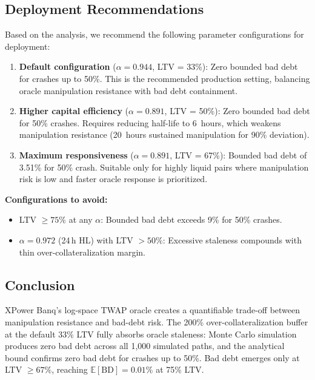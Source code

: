 \documentclass[10pt,a4paper,twocolumn]{article}
\theoremstyle{definition}
\theoremstyle{plain}
\theoremstyle{remark}
\begin{document}
\subsection{Deployment Recommendations}
\label{sec:bd-recommendations}

Based on the analysis, we recommend the following parameter configurations for deployment:

\begin{enumerate}[leftmargin=*]
\item \textbf{Default configuration} ($\alpha = 0.944$, LTV = 33\%): Zero bounded bad debt for crashes up to 50\%. This is the recommended production setting, balancing oracle manipulation resistance with bad debt containment.

\item \textbf{Higher capital efficiency} ($\alpha = 0.891$, LTV = 50\%): Zero bounded bad debt for 50\% crashes. Requires reducing half-life to 6~hours, which weakens manipulation resistance (20~hours sustained manipulation for 90\% deviation).

\item \textbf{Maximum responsiveness} ($\alpha = 0.891$, LTV = 67\%): Bounded bad debt of 3.51\% for 50\% crash. Suitable only for highly liquid pairs where manipulation risk is low and faster oracle response is prioritized.
\end{enumerate}

\textbf{Configurations to avoid:}
\begin{itemize}[leftmargin=*]
\item LTV $\geq 75\%$ at any $\alpha$: Bounded bad debt exceeds 9\% for 50\% crashes.
\item $\alpha = 0.972$ (24\,h HL) with LTV $> 50\%$: Excessive staleness compounds with thin over-collateralization margin.
\end{itemize}

\subsection{Conclusion}
\label{sec:bd-conclusion}

XPower Banq's log-space TWAP oracle creates a quantifiable trade-off between manipulation resistance and bad-debt risk. The 200\% over-collateralization buffer at the default 33\% LTV fully absorbs oracle staleness: Monte Carlo simulation produces zero bad debt across all 1{,}000 simulated paths, and the analytical bound confirms zero bad debt for crashes up to 50\%. Bad debt emerges only at LTV $\geq 67\%$, reaching $\mathbb{E}[\text{BD}] = 0.01\%$ at 75\% LTV.
\end{document}
